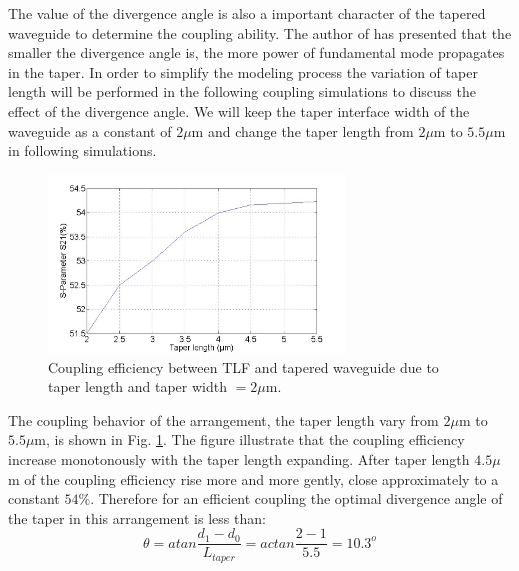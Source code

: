The value of the divergence angle is also a important character of the tapered waveguide to determine the coupling ability. The author of \cite{study_linear_tapered_waveguides} has presented that the smaller the divergence angle is, the more power of fundamental mode propagates in the taper. In order to simplify the modeling process the variation of taper length will be performed in the following coupling simulations to discuss the effect of the divergence angle.
We will keep the taper interface width of the waveguide as a constant of $2\mu$m and change the taper length from $2\mu$m to $5.5\mu$m in following simulations.\\
  
\begin{figure}[!ht]
\centering
\includegraphics[width=0.7\textwidth]{bilder/tapered_waveguide_dxx}
\caption{Coupling efficiency between TLF and tapered waveguide due to taper length and taper width $= 2\mu$m.}
\label{fig:tapered_waveguide_dxx}
\end{figure}
The coupling behavior of the arrangement, the taper length vary from $2\mu$m to $5.5\mu$m, is shown in Fig. \ref{fig:tapered_waveguide_dxx}.  The figure illustrate that the coupling efficiency increase monotonously with the taper length expanding. After taper length $4.5\mu$m of the coupling efficiency rise more and more gently, close approximately to a constant $54\%$. 
Therefore for an efficient coupling the optimal divergence angle of the taper in this arrangement is less than:
\begin{equation}
\theta=atan\frac{d_{1}-d_{0}}{L_{taper}}=actan\frac{2-1}{5.5}=10.3^{o}
\label{eq:divergence_angle}
\end{equation}
